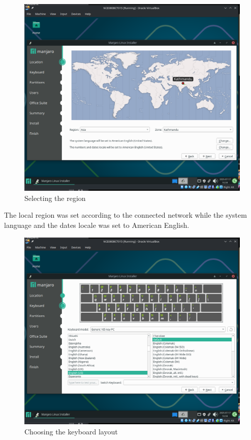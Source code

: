 \documentclass[a4paper,12pt]{report}
\begin{document}
\begin{figure}[h]
    \centering
    \includegraphics[width=1\linewidth]{install2.png}
    \caption{Selecting the region}
    \label{fig11}
\end{figure}
\newpage
The local region was set according to the connected network while the system language and the dates locale was set to American English.
\newpage
\begin{figure}[h]
    \centering
    \includegraphics[width=1\linewidth]{install3.png}
    \caption{Choosing the keyboard layout}
    \label{fig12}
\end{figure}
\end{document}
